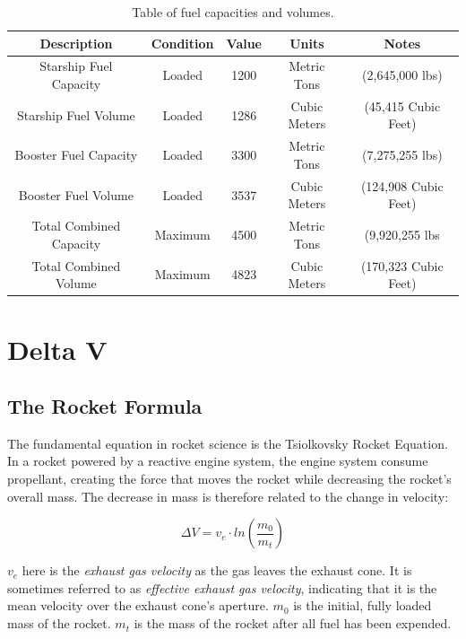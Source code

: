\documentclass[11pt]{article}
\begin{document}
\begin{table}[H]
\begin{center}
\caption{\label{FuelSpecs}Table of fuel capacities and volumes.}
\begin{tabular}{||c c c c c||} 
 \hline
 Description & Condition & Value & Units & Notes \\ [0.5ex]
 \hline
 Starship Fuel Capacity & Loaded & 1200 & Metric Tons & (2,645,000 lbs) \\ 
 \hline
 Starship Fuel Volume & Loaded & 1286 & Cubic Meters & (45,415 Cubic Feet) \\
 \hline
 Booster Fuel Capacity & Loaded & 3300 & Metric Tons & (7,275,255 lbs) \\ 
 \hline
 Booster Fuel Volume & Loaded & 3537 & Cubic Meters & (124,908 Cubic Feet) \\
 \hline
 Total Combined Capacity & Maximum & 4500 & Metric Tons & (9,920,255 lbs \\
 \hline
 Total Combined Volume & Maximum & 4823 & Cubic Meters & (170,323 Cubic Feet) \\
 \hline
\end{tabular}
\end{center}
\end{table} 




\section{Delta V}

\subsection{The Rocket Formula}

The fundamental equation in rocket science is the Tsiolkovsky Rocket Equation. In a rocket powered by a reactive engine system, the engine system consume propellant, creating the force that moves the rocket while decreasing the rocket's overall mass. The decrease in mass is therefore related to the change in velocity:

\[\Delta V = v_e \cdot ln \left( \frac{m_0}{m_t} \right)\]

$v_e$ here is the \emph{exhaust gas velocity} as the gas leaves the exhaust cone. It is sometimes referred to as \emph{effective exhaust gas velocity}, indicating that it is the mean velocity over the exhaust cone's aperture. $m_0$ is the initial, fully loaded mass of the rocket. $m_t$ is the mass of the rocket after all fuel has been expended. 
\end{document}
